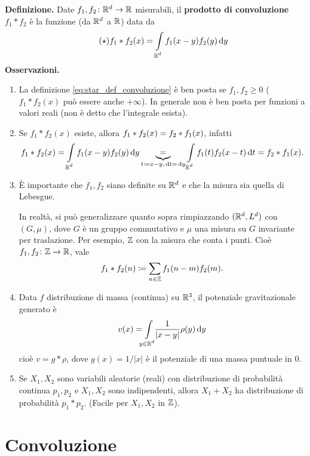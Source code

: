 \documentclass[a4paper, 12pt]{report}
\begin{document}
\textbf{Definizione.} Date $f_1,f_2 \colon  \mathbb R^d \to \mathbb R$ misurabili, il \textbf{prodotto di convoluzione} $f_1 \ast f_2$ è la funzione (da $\mathbb R^d$ a $\mathbb R$) data da
%
\begin{equation} \tag{$\star$} \label{eq:star_def_convoluzione}
	f_1 \ast f_2(x) = \int\limits_{\mathclap{\R^d}} f_1(x-y) f_2(y) \dd y
\end{equation}
%
\textbf{Osservazioni.}
\begin{enumerate}
\item La definizione \eqref{eq:star_def_convoluzione} è ben posta se $f_1,f_2 \geq 0$ ($f_1 \ast f_2(x)$ può essere anche $+\infty$).
In generale non è ben posta per funzioni a valori reali (non è detto che l'integrale esista).

\item Se $f_1 \ast f_2(x)$ esiste, allora $\displaystyle f_1 \ast f_2(x) = f_2 \ast f_1(x)$, infatti
%
$$
f_1 \ast f_2 (x) = \int\limits_{\mathclap{\R^d}} f_1(x-y) f_2(y) \dd y \underbrace{=}_{t \coloneqq x - y, \dd t = \dd y} \int\limits_{\mathclap{\R^d}} f_1(t) f_2(x-t) \dd t = f_2 \ast f_1(x).
$$
%

\item È importante che $f_1,f_2$ siano definite su $\mathbb R^d$ e che la misura sia quella di Lebesgue.

In realtà, si può generalizzare quanto sopra rimpiazzando $(\mathbb R^d, L^d)$ con $(G,\mu)$, dove $G$ è un gruppo commutativo e $\mu$ una misura su $G$ invariante per traslazione. Per esempio, $\mathbb Z$ con la misura che conta i punti. Cioè $f_1,f_2 \colon \mathbb Z \to \mathbb R$, vale
%
$$
f_1 \ast f_2(n) \coloneqq \sum_{n \in \mathbb Z} f_1(n - m) f_2(m).
$$
%

\item Data $f$ distribuzione di massa (continua) su $\mathbb R^3$, il potenziale gravitazionale generato è
%
$$
v(x) = \int\limits_{\mathclap{y \in \R^d}} \frac{1}{\left| x - y \right|} \rho(y) \dd y
$$
%
cioè $v = g \ast \rho$, dove  $g (x) = 1 / \left| x \right|$ è il potenziale di una massa puntuale in $0$.

\item Se $X_1, X_2$ sono variabili aleatorie (reali) con distribuzione di probabilità continua $p_1,p_2$ e $X_1,X_2$ sono indipendenti, allora $X_1 + X_2$ ha distribuzione di probabilità $p_1 \ast p_2$. (Facile per $X_1,X_2$ in $\mathbb Z$).

\end{enumerate}

%
%

\section{Convoluzione}
\end{document}
